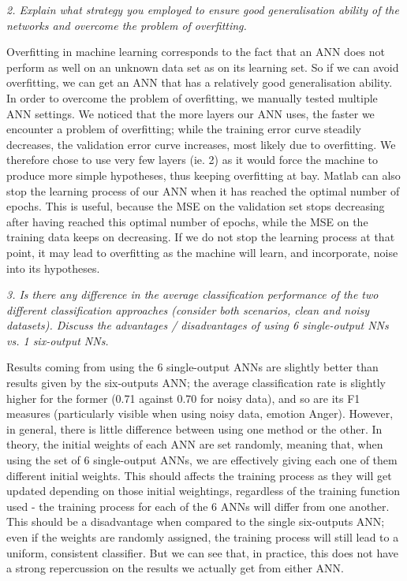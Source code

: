 \documentclass[a4wide, 11pt]{article}
\begin{document}
\textit{2. Explain what strategy you employed to ensure good generalisation ability of the networks and overcome the problem of overfitting.}

Overfitting in machine learning corresponds to the fact that an ANN does not perform as well on an unknown data set as on its learning set. So if we can avoid overfitting, we can get an ANN that has a relatively good generalisation ability. In order to overcome the problem of overfitting, we manually tested multiple ANN settings. We noticed that the more layers our ANN uses, the faster we encounter a problem of overfitting; while the training error curve steadily decreases, the validation error curve increases, most likely due to overfitting. We therefore chose to use very few layers (ie. 2) as it would force the machine to produce more simple hypotheses, thus keeping overfitting at bay. Matlab can also stop the learning process of our ANN when it has reached the optimal number of epochs. This is useful, because the MSE on the validation set stops decreasing after having reached this optimal number of epochs, while the MSE on the training data keeps on decreasing. If we do not stop the learning process at that point, it may lead to overfitting as the machine will learn, and incorporate, noise into its hypotheses.

\textit{3. Is there any difference in the average classification performance of the two different classification approaches (consider both scenarios, clean and noisy datasets). Discuss the advantages / disadvantages of using 6 single-output NNs vs. 1 six-output NNs.}

Results coming from using the 6 single-output ANNs are slightly better than results given by the six-outputs ANN; the average classification rate is slightly higher for the former (0.71 against 0.70 for noisy data), and so are its F1 measures (particularly visible when using noisy data, emotion Anger). However, in general, there is little difference between using one method or the other. 
In theory, the initial weights of each ANN are set randomly, meaning that, when using the set of 6 single-output ANNs, we are effectively giving each one of them different initial weights. This should affects the training process as they will get updated depending on those initial weightings, regardless of the training function used - the training process for each of the 6 ANNs will differ from one another. This should be a disadvantage when compared to the single six-outputs ANN; even if the weights are randomly assigned, the training process will still lead to a uniform, consistent classifier. But we can see that, in practice, this does not have a strong repercussion on the results we actually get from either ANN. 
\end{document}
